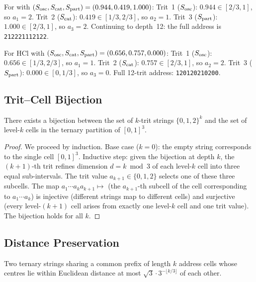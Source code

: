 \begin{example}[Water]
For  with $(S_{\mathrm{osc}}, S_{\mathrm{cat}}, S_{\mathrm{part}}) = (0.944, 0.419, 1.000)$:
Trit~1 ($S_{\mathrm{osc}}$): $0.944 \in [2/3,1]$, so $a_1 = 2$.
Trit~2 ($S_{\mathrm{cat}}$): $0.419 \in [1/3,2/3]$, so $a_2 = 1$.
Trit~3 ($S_{\mathrm{part}}$): $1.000 \in [2/3,1]$, so $a_3 = 2$.
Continuing to depth~12: the full address is \texttt{212221112122}.
\end{example}

\begin{example}[HCl]
For HCl with $(S_{\mathrm{osc}}, S_{\mathrm{cat}}, S_{\mathrm{part}}) = (0.656, 0.757, 0.000)$:
Trit~1 ($S_{\mathrm{osc}}$): $0.656 \in [1/3,2/3]$, so $a_1 = 1$.
Trit~2 ($S_{\mathrm{cat}}$): $0.757 \in [2/3,1]$, so $a_2 = 2$.
Trit~3 ($S_{\mathrm{part}}$): $0.000 \in [0,1/3]$, so $a_3 = 0$.
Full 12-trit address: \texttt{120120210200}.
\end{example}

\subsection{Trit--Cell Bijection}
\label{sec:ch23-bijection-trit}

\begin{theorem}
\label{thm:ch23-trit-cell}
There exists a bijection between the set of $k$-trit strings $\{0,1,2\}^k$
and the set of level-$k$ cells in the ternary partition of $[0,1]^3$.
\end{theorem}

\begin{proof}
We proceed by induction.  Base case ($k = 0$): the empty string corresponds
to the single cell $[0,1]^3$.  Inductive step: given the bijection at depth
$k$, the $(k+1)$-th trit refines dimension $d = k \bmod 3$ of each level-$k$
cell into three equal sub-intervals.  The trit value $a_{k+1} \in \{0,1,2\}$
selects one of these three subcells.  The map $a_1 \cdots a_k a_{k+1} \mapsto$
(the $a_{k+1}$-th subcell of the cell corresponding to $a_1 \cdots a_k$) is
injective (different strings map to different cells) and surjective (every
level-$(k+1)$ cell arises from exactly one level-$k$ cell and one trit value).
The bijection holds for all $k$.
\end{proof}

\subsection{Distance Preservation}
\label{sec:ch23-dist}

\begin{theorem}
\label{thm:ch23-prefix-distance}
Two ternary strings sharing a common prefix of length $k$ address cells
whose centres lie within Euclidean distance at most
$\sqrt{3} \cdot 3^{-\lfloor k/3 \rfloor}$ of each other.
\end{theorem}

